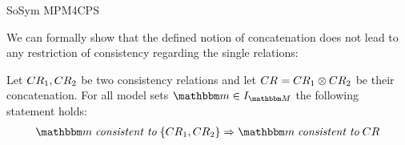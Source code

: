 \begin{copiedFrom}{SoSym MPM4CPS}




We can formally show that the defined notion of concatenation does not lead to any restriction of consistency regarding the single relations:

\begin{lemma} \label{lemma:concatenationimpliesconsistency}
    Let $CR_{1}, CR_{2}$ be two consistency relations and let $CR_{} = CR_{1} \otimes CR_{2}$ be their concatenation. For all model sets $\modelset{m} \in \metamodelinstances{\metamodelset{M}}$ the following statement holds:
    \begin{align*}
        \formulaskip &
        \modelset{m} \consistenttomath \setted{\consistencyrelation{CR}{1}, \consistencyrelation{CR}{2}} \Rightarrow \modelset{m} \consistenttomath \consistencyrelation{CR}{}
    \end{align*}
\end{lemma}


\end{copiedFrom}
